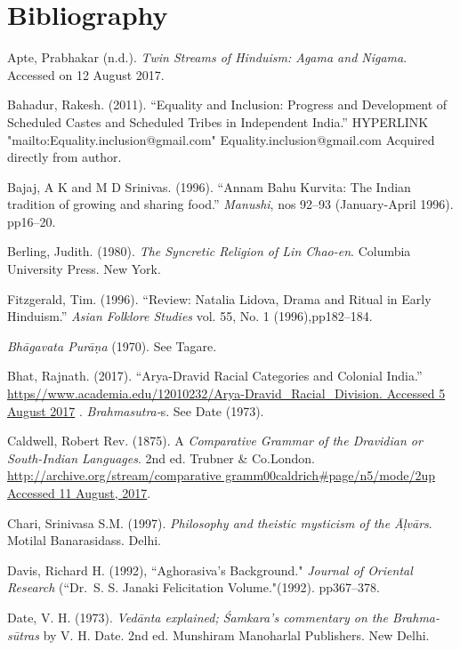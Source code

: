 \section*{Bibliography}

\begin{thebibliography}{99}
 Apte, Prabhakar (n.d.). \textit{Twin Streams of Hinduism: Agama and Nigama}. Accessed on 12 August 2017.

  Bahadur, Rakesh. (2011). “Equality and Inclusion: Progress and Development of Scheduled Castes and Scheduled Tribes in Independent India.” HYPERLINK "mailto:Equality.inclusion@gmail.com" Equality.inclusion@gmail.com Acquired directly from author.

  Bajaj, A K and M D Srinivas. (1996). “Annam Bahu Kurvita: The Indian tradition of growing and sharing food.” \textit{Manushi}, nos 92–93 (January-April 1996). pp16–20.

  Berling, Judith. (1980). \textit{The Syncretic Religion of Lin Chao-en}. Columbia University Press. New York.

  Fitzgerald, Tim. (1996). “Review: Natalia Lidova, Drama and Ritual in Early Hinduism.” \textit{Asian Folklore Studies} vol. 55, No. 1 (1996),\break pp182–184.

  \textit{Bhāgavata Purāṇa} (1970). See Tagare.

  Bhat, Rajnath. (2017). “Arya-Dravid Racial Categories and Colonial India.” \url{https//www.academia.edu/12010232/Arya-Dravid_Racial_Division. Accessed 5 August 2017}
. 
  \textit{Brahmasutra-}s. See Date (1973).

  Caldwell, Robert Rev. (1875). A \textit{Comparative Grammar of the Dravidian or South-Indian Languages}. 2nd ed. Trubner \& Co.London. \url{http://archive.org/stream/comparative gramm00caldrich#page/n5/mode/2up Accessed 11 August, 2017}.

  Chari, Srinivasa S.M. (1997). \textit{Philosophy and theistic mysticism of the Āļvārs}. Motilal Banarasidass. Delhi.

  Davis, Richard H. (1992), “Aghorasiva's Background." \textit{Journal of Oriental Research} (“Dr.\ S. S. Janaki Felicitation Volume."(1992). pp367–378.

  Date, V. H. (1973). \textit{Vedānta explained; Śamkara’s commentary on the Brahma-sūtras} by V. H. Date. 2nd ed. Munshiram Manoharlal Publishers. New Delhi.


\end{thebibliography}
